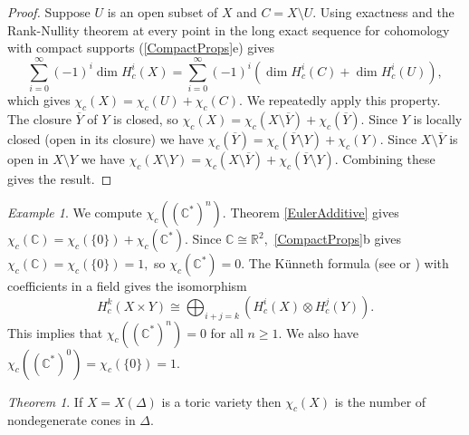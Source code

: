 \documentclass[BSc]{usydthesis}
\numberwithin{equation}{chapter}
\theoremstyle{remark}
\newtheorem{Theorem}[equation]{Theorem}
\newtheorem{Example}[equation]{Example}
\newcommand{\R}{\mathbb{R}}
\newcommand{\C}{\mathbb{C}}
\begin{document}
\begin{proof}
 Suppose $U$ is an open subset of $X$ and $C=X\setminus U.$ Using exactness and the Rank-Nullity theorem at every point in the long exact sequence for cohomology with compact supports (\ref{CompactProps}e) gives $$\sum_{i=0}^{\infty} (-1)^i \dim H^i_c(X) = \sum_{i=0}^{\infty} (-1)^i \left(\dim H^i_c (C) +\dim H^i_c (U)\right),$$ which gives $\chi_c(X) = \chi_c(U) + \chi_c(C).$ We repeatedly apply this property. The closure $\overline{Y}$ of $Y$ is closed, so $\chi_c(X) = \chi_c(X\setminus \overline{Y}) + \chi_c(\overline{Y}).$ Since $Y$ is locally closed (open in its closure) we have $\chi_c(\overline{Y}) =  \chi_c(\overline{Y}\setminus Y) + \chi_c(Y).$ Since $X\setminus \overline{Y}$ is open in $X\setminus Y$ we have $\chi_c(X\setminus Y) = \chi_c( X\setminus \overline{Y} ) + \chi_c( \overline{Y}\setminus Y ).$ Combining these gives the result.
\end{proof}



\begin{Example}\label{TorusCharacteristic}
 We compute $\chi_c( (\C^*)^n).$ Theorem \ref{EulerAdditive} gives $\chi_c(\C) = \chi_c ( \{ 0 \} ) + \chi_c (\C^*).$ Since $\C \cong \R^2,$ \ref{CompactProps}b gives $\chi_c(\C) = \chi_c ( \{ 0 \} )=1,$ so $\chi_c(\C^*)=0.$ The K\"{u}nneth formula (see \cite[\S 5.3]{Spanier} or \cite[\S 3.B]{Hatcher}) with coefficients in a field gives the isomorphism $$H^k_c ( X \times Y) \cong \bigoplus_{i+j=k} \left( H^i_c (X) \otimes H^j_c(Y) \right).$$ This implies that $\chi_c ( (\C^*)^n )=0$ for all $n\geq 1.$ We also have $\chi_c ( (\C^*)^0 ) = \chi_c ( \{ 0 \} ) =1.$
\end{Example}

\begin{Theorem}
 If $X=X(\Delta)$ is a toric variety then $\chi_c(X)$ is the number of nondegenerate cones in $\Delta.$ 
\end{Theorem}
\end{document}

